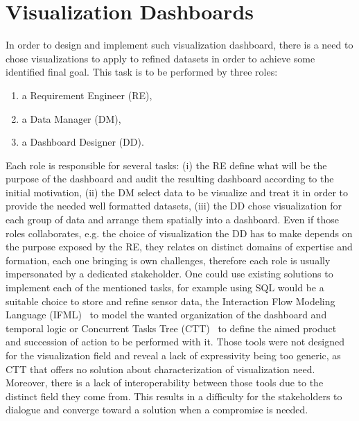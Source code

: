 \documentclass{acm_proc_article-sp}
\begin{document}
\section{Visualization Dashboards}
In order to design and implement such visualization dashboard, there
is a need to chose visualizations to apply to refined datasets in
order to achieve some identified final goal. This task is to be
performed by three roles:
\begin{enumerate}
\item a Requirement Engineer (RE),
\item a Data Manager (DM),
\item a Dashboard Designer (DD).
\end{enumerate}
Each role is responsible for several tasks: (i) the RE define what
will be the purpose of the dashboard and audit the resulting dashboard
according to the initial motivation, (ii) the DM select data to be
visualize and treat it in order to provide the needed well formatted
datasets, (iii) the DD chose visualization for each group of data and
arrange them spatially into a dashboard.
Even if those roles collaborates, e.g. the choice of visualization the
DD has to make depends on the purpose exposed by the RE, they relates
on distinct domains of expertise and formation, each one bringing is
own challenges, therefore each role is usually impersonated by a
dedicated stakeholder.  
One could use existing solutions to implement each of the mentioned
tasks, for example using SQL would be a suitable choice to store and
refine sensor data, the Interaction Flow Modeling Language
(IFML)~\cite{} to model the wanted organization of the dashboard and
temporal logic or Concurrent Tasks Tree (CTT)~\cite{} to define the
aimed product and succession of action to be performed with it.
Those tools were not designed for the visualization field and reveal a
lack of expressivity being too generic, as CTT that offers no solution
about characterization of visualization need.
Moreover, there is a lack of interoperability between those tools due
to the distinct field they come from. This results in a difficulty for
the stakeholders to dialogue and converge toward a solution when a
compromise is needed.
\end{document}
